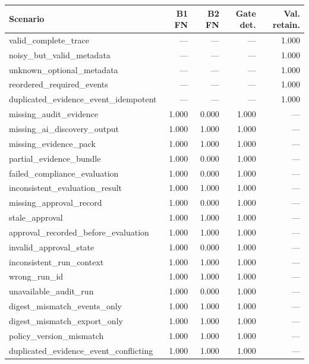 \begin{tabular}{lrrrr}
\toprule
Scenario & B1 FN & B2 FN & Gate det. & Val. retain. \\
\midrule
valid\_complete\_trace & --- & --- & --- & 1.000 \\
noisy\_but\_valid\_metadata & --- & --- & --- & 1.000 \\
unknown\_optional\_metadata & --- & --- & --- & 1.000 \\
reordered\_required\_events & --- & --- & --- & 1.000 \\
duplicated\_evidence\_event\_idempotent & --- & --- & --- & 1.000 \\
missing\_audit\_evidence & 1.000 & 0.000 & 1.000 & --- \\
missing\_ai\_discovery\_output & 1.000 & 1.000 & 1.000 & --- \\
missing\_evidence\_pack & 1.000 & 1.000 & 1.000 & --- \\
partial\_evidence\_bundle & 1.000 & 0.000 & 1.000 & --- \\
failed\_compliance\_evaluation & 1.000 & 0.000 & 1.000 & --- \\
inconsistent\_evaluation\_result & 1.000 & 1.000 & 1.000 & --- \\
missing\_approval\_record & 1.000 & 0.000 & 1.000 & --- \\
stale\_approval & 1.000 & 1.000 & 1.000 & --- \\
approval\_recorded\_before\_evaluation & 1.000 & 1.000 & 1.000 & --- \\
invalid\_approval\_state & 1.000 & 0.000 & 1.000 & --- \\
inconsistent\_run\_context & 1.000 & 1.000 & 1.000 & --- \\
wrong\_run\_id & 1.000 & 1.000 & 1.000 & --- \\
unavailable\_audit\_run & 1.000 & 0.000 & 1.000 & --- \\
digest\_mismatch\_events\_only & 1.000 & 1.000 & 1.000 & --- \\
digest\_mismatch\_export\_only & 1.000 & 1.000 & 1.000 & --- \\
policy\_version\_mismatch & 1.000 & 1.000 & 1.000 & --- \\
duplicated\_evidence\_event\_conflicting & 1.000 & 1.000 & 1.000 & --- \\
\bottomrule
\end{tabular}
